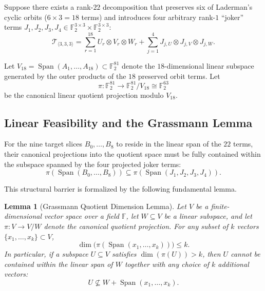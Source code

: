\documentclass[11pt,reqno]{amsart}
\theoremstyle{plain}
\newtheorem{lemma}{Lemma}
\theoremstyle{definition}
\begin{document}
Suppose there exists a rank-$22$ decomposition that preserves six of Laderman's cyclic orbits ($6 \times 3 = 18$ terms) and introduces four arbitrary rank-$1$ ``joker'' terms $J_1, J_2, J_3, J_4 \in \mathbb{F}_2^{3 \times 3} \times \mathbb{F}_2^{3 \times 3}$:
\begin{equation}
\mathcal{T}_{\langle 3, 3, 3 \rangle} = \sum_{r=1}^{18} U_r \otimes V_r \otimes W_r + \sum_{j=1}^4 J_{j, U} \otimes J_{j, V} \otimes J_{j, W}.
\end{equation}

Let $V_{18} = \operatorname{Span}(A_1, \dots, A_{18}) \subset \mathbb{F}_2^{81}$ denote the $18$-dimensional linear subspace generated by the outer products of the $18$ preserved orbit terms. Let
\begin{equation}
\pi \colon \mathbb{F}_2^{81} \longrightarrow \mathbb{F}_2^{81} / V_{18} \cong \mathbb{F}_2^{63}
\end{equation}
be the canonical linear quotient projection modulo $V_{18}$.

\subsection{Linear Feasibility and the Grassmann Lemma}

For the nine target slices $B_0, \dots, B_8$ to reside in the linear span of the $22$ terms, their canonical projections into the quotient space must be fully contained within the subspace spanned by the four projected joker terms:
\begin{equation}
\pi(\operatorname{Span}(B_0, \dots, B_8)) \subseteq \pi(\operatorname{Span}(J_1, J_2, J_3, J_4)).
\end{equation}

This structural barrier is formalized by the following fundamental lemma.

\begin{lemma}[Grassmann Quotient Dimension Lemma]\label{lem:grassmann}
Let $V$ be a finite-dimensional vector space over a field $\mathbb{F}$, let $W \subseteq V$ be a linear subspace, and let $\pi \colon V \to V/W$ denote the canonical quotient projection. For any subset of $k$ vectors $\{x_1, \dots, x_k\} \subset V$,
\begin{equation}
\dim \bigl( \pi(\operatorname{Span}(x_1, \dots, x_k)) \bigr) \le k.
\end{equation}
In particular, if a subspace $U \subseteq V$ satisfies $\dim(\pi(U)) > k$, then $U$ cannot be contained within the linear span of $W$ together with any choice of $k$ additional vectors:
\begin{equation}
U \not\subseteq W + \operatorname{Span}(x_1, \dots, x_k).
\end{equation}
\end{lemma}
\end{document}
